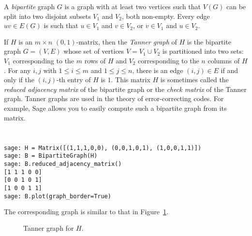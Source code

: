 A \emph{bipartite} graph $G$ is a graph with at least two
vertices such that $V(G)$ can be split into two disjoint subsets $V_1$
and $V_2$, both non-empty. Every edge $uv \in E(G)$ is such that
$u \in V_1$ and $v \in V_2$, or $v \in V_1$ and $u \in V_2$.

If $H$ is an $m \times n$ $(0,1)$-matrix, then the \emph{Tanner graph}
of $H$ is the bipartite graph $G = (V,E)$ whose set of vertices
$V = V_1 \cup V_2$ is partitioned into two sets: $V_1$ corresponding
to the $m$ rows of $H$ and $V_2$ corresponding to the $n$ columns of $H$.
For any $i,j$ with $1 \leq i \leq m$ and $1 \leq j \leq n$, there is
an edge $(i,j) \in E$ if and only if the $(i,j)$-th entry of $H$ is
$1$. This matrix $H$ is sometimes called the
\emph{reduced adjacency matrix} of the bipartite graph or the
\emph{check matrix} of the Tanner graph.
Tanner graphs are used in the theory of error-correcting codes.
For example, Sage allows you to easily compute such
a bipartite graph from its matrix.
%
\begin{center}
\fontsize{9pt}{9pt}
\selectfont
\tt
\begin{lstlisting}
sage: H = Matrix([(1,1,1,0,0), (0,0,1,0,1), (1,0,0,1,1)])
sage: B = BipartiteGraph(H)
sage: B.reduced_adjacency_matrix()
[1 1 1 0 0]
[0 0 1 0 1]
[1 0 0 1 1]
sage: B.plot(graph_border=True)
\end{lstlisting}
\end{center}
%
%
The corresponding graph is similar to that in
Figure~\ref{fig:introduction:tanner_graph}.

\begin{figure}[!htbp]
\centering
{}
\caption{Tanner graph for $H$.}
\label{fig:introduction:tanner_graph}
\end{figure}

